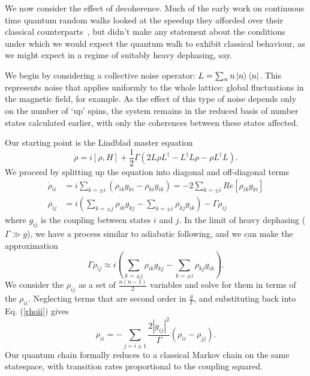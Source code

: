 
    We now consider the effect of decoherence. Much of the early work on continuous time quantum random walks looked at the speedup they afforded over their classical counterparts~\cite{Farhi:1998p6471}, but didn't make  any statement about the conditions under which we would expect the quantum walk to exhibit classical behaviour, as we might expect in a regime of suitably heavy dephasing, say.

    We begin by considering a collective noise operator: $ L=\sum_{n}n\left\vert n\right\rangle\left\langle n\right\vert$.  This represents noise that applies uniformly to the whole lattice: global fluctuations in the magnetic field, for example. As the effect of this type of noise depends only on the number of `up' spins, the system remains in the reduced basis of number states calculated earlier, with only the coherences between these states affected.

Our starting point is the Lindblad master equation
\begin{equation}
\dot{\rho}=i\left[\rho,H\right]+\frac{1}{2}\Gamma\left(2L\rho
    L^{\dagger}-L^{\dagger}L\rho-\rho L^{\dagger}L\right).
\end{equation}
We proceed by splitting up the equation into diagonal and off-diagonal terms
\begin{align}
\dot{\rho}_{ii} & = i\sum_{k=\pm i}\left(\rho_{ik}g_{ki}-\rho_{ki}g_{ik}\right)=-2\sum_{k=\pm i}Re\left[\rho_{ik}g_{ki}\right] \label{rhoii}\\
\dot{\rho_{ij}} & = i\left(\sum_{k=\pm j}\rho_{ik}g_{kj}-\sum_{k=\pm i}\rho_{kj}g_{ik}\right)-\Gamma\rho_{ij}
\end{align}
where $g_{ij}$ is the coupling between states $i$ and $j$. In the limit of heavy dephasing ($\Gamma\gg g$), we have a process similar to adiabatic following, and we can make the approximation\[ \Gamma\rho_{ij}\approx i\left(\sum_{k=\pm j}\rho_{ik}g_{kj}-\sum_{k=\pm i}\rho_{kj}g_{ik}\right).\] We consider the $\rho_{ij}$ as a set of $\frac{n(n-1)}{2}$ variables and solve for them in terms of the $\rho_{ii}$. Neglecting terms that are second order in $\frac{g}{\Gamma}$, and substituting back into Eq. (\ref{rhoii}) gives \[ \dot{\rho}_{ii}=-\sum_{j=i\pm1}\frac{2|g_{ij}|^{2}}{\Gamma}\left(\rho_{ii}-\rho_{jj}\right).\]
Our quantum chain formally reduces to a classical Markov chain on the same statespace, with transition rates proportional to the coupling squared.

